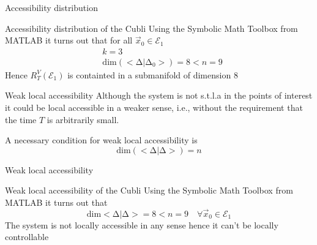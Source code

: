 \begin{frame}{Accessibility distribution \cubli}
  \begin{exampleblock}{Accessibility distribution of the Cubli}
    Using the Symbolic Math Toolbox from MATLAB it turns out that for all $\vec{x}_{0} \in \mathcal{E}_{1}$ 
    \[
    \begin{split}
      &k = 3\\
      &\mathrm{dim}(<\mathrm{\Delta}|\mathrm{\Delta}_0>) = 8 < n = 9
    \end{split}
    \]
    Hence $R_{T}^{V}(\mathcal{E}_{1})$ is containted in a submanifold of dimension $8$
  \end{exampleblock}
\end{frame}

\begin{frame}{Weak local accessibility \theory}
  Although the system is not s.t.l.a in the points of interest it could be local accessible
  in a weaker sense, i.e., without the requirement that the time $T$ is arbitrarily small.
  \begin{theorem}
    A \alert{necessary} condition for weak local accessibility is
    \[
    \mathrm{dim}(<\mathrm{\Delta}|\mathrm{\Delta}>) = n
    \]
  \end{theorem}
\end{frame}

\begin{frame}{Weak local accessibility \cubli}
  \begin{exampleblock}{Weak local accessibility of the Cubli}
    Using the Symbolic Math Toolbox from MATLAB it turns out that
    \[
    \mathrm{dim} <\mathrm{\Delta} | \mathrm{\Delta}> = 8 < n = 9
    \quad \forall \vec{x}_0 \in \mathcal{E}_1
    \]
    \alert{The system is not locally accessible in any sense hence it can't be locally controllable}
  \end{exampleblock}
\end{frame}
